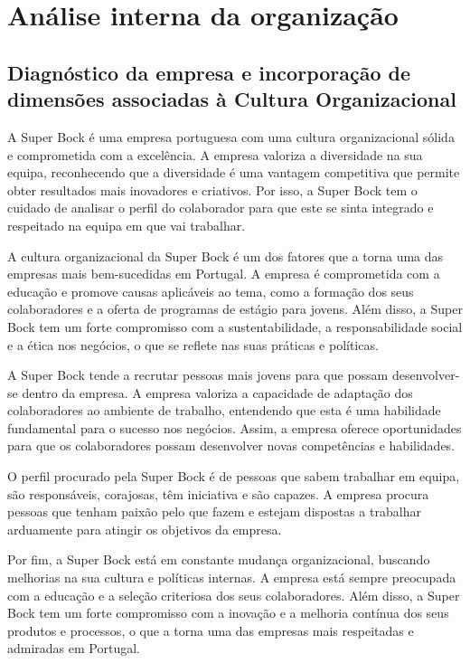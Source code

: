 \chapter{Análise interna da organização}
\label{Chapter2} %

\section{Diagnóstico da empresa e incorporação de dimensões associadas à Cultura Organizacional}

A Super Bock é uma empresa portuguesa com uma cultura organizacional sólida e comprometida com a excelência. A empresa valoriza a diversidade na sua equipa, reconhecendo que a diversidade é uma vantagem competitiva que permite obter resultados mais inovadores e criativos. Por isso, a Super Bock tem o cuidado de analisar o perfil do colaborador para que este se sinta integrado e respeitado na equipa em que vai trabalhar.

A cultura organizacional da Super Bock é um dos fatores que a torna uma das empresas mais bem-sucedidas em Portugal. A empresa é comprometida com a educação e promove causas aplicáveis ao tema, como a formação dos seus colaboradores e a oferta de programas de estágio para jovens. Além disso, a Super Bock tem um forte compromisso com a sustentabilidade, a responsabilidade social e a ética nos negócios, o que se reflete nas suas práticas e políticas.

A Super Bock tende a recrutar pessoas mais jovens para que possam desenvolver-se dentro da empresa. A empresa valoriza a capacidade de adaptação dos colaboradores ao ambiente de trabalho, entendendo que esta é uma habilidade fundamental para o sucesso nos negócios. Assim, a empresa oferece oportunidades para que os colaboradores possam desenvolver novas competências e habilidades.

O perfil procurado pela Super Bock é de pessoas que sabem trabalhar em equipa, são responsáveis, corajosas, têm iniciativa e são capazes. A empresa procura pessoas que tenham paixão pelo que fazem e estejam dispostas a trabalhar arduamente para atingir os objetivos da empresa.

Por fim, a Super Bock está em constante mudança organizacional, buscando melhorias na sua cultura e políticas internas. A empresa está sempre preocupada com a educação e a seleção criteriosa dos seus colaboradores. Além disso, a Super Bock tem um forte compromisso com a inovação e a melhoria contínua dos seus produtos e processos, o que a torna uma das empresas mais respeitadas e admiradas em Portugal. 

